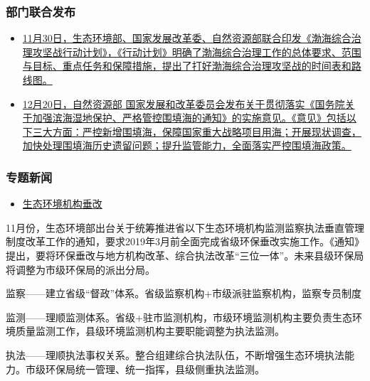 \documentclass[]{book}
\providecommand{\tightlist}{%
  \setlength{\itemsep}{0pt}\setlength{\parskip}{0pt}}
\begin{document}
\hypertarget{ux90e8ux95e8ux8054ux5408ux53d1ux5e03-1}{%
\subsubsection*{部门联合发布}\label{ux90e8ux95e8ux8054ux5408ux53d1ux5e03-1}}

\begin{itemize}
\item
  \href{http://www.gov.cn/xinwen/2018-11/29/content_5344537.htm}{11月30日，生态环境部、国家发展改革委、自然资源部联合印发《渤海综合治理攻坚战行动计划》，《行动计划》明确了渤海综合治理工作的总体要求、范围与目标、重点任务和保障措施，提出了打好渤海综合治理攻坚战的时间表和路线图。}
\item
  \href{http://www.ndrc.gov.cn/zcfb/zcfbghwb/201811/t20181107_919133.html}{12月20日，自然资源部 国家发展和改革委员会发布关于贯彻落实《国务院关于加强滨海湿地保护、严格管控围填海的通知》的实施意见。《意见》包括以下三大方面：严控新增围填海，保障国家重大战略项目用海；开展现状调查，加快处理围填海历史遗留问题；提升监管能力，全面落实严控围填海政策。}
\end{itemize}

\hypertarget{ux4e13ux9898ux65b0ux95fb}{%
\subsubsection*{专题新闻}\label{ux4e13ux9898ux65b0ux95fb}}

\begin{itemize}
\tightlist
\item
  \href{http://www.jxepb.gov.cn/ZWGK/ZTZL/hjtzggqhzrddzl/zcwj/2018/0d1de54e2b4043338527246d1f9e3252.htm}{生态环境机构垂改}
\end{itemize}

11月份，生态环境部出台关于统筹推进省以下生态环境机构监测监察执法垂直管理制度改革工作的通知，要求2019年3月前全面完成省级环保垂改实施工作。《通知》提出，要将环保垂改与地方机构改革、综合执法改革``三位一体''。未来县级环保局将调整为市级环保局的派出分局。

监察------建立省级``督政''体系。省级监察机构+市级派驻监察机构，监察专员制度

监测------理顺监测体系。省级+驻市监测机构，市级环境监测机构主要负责生态环境质量监测工作，县级环境监测机构主要职能调整为执法监测。

执法------理顺执法事权关系。整合组建综合执法队伍，不断增强生态环境执法能力。市级环保局统一管理、统一指挥，县级侧重执法监测。
\end{document}
